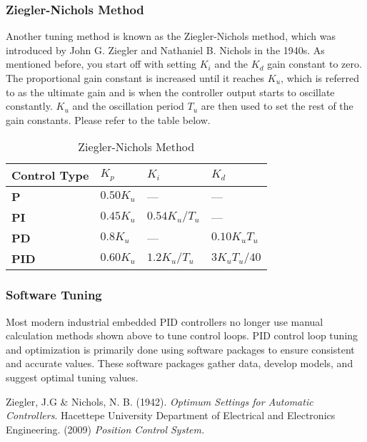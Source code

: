 \documentclass[10pt,conference]{IEEEtran}
\begin{document}
\subsubsection{Ziegler-Nichols Method}

Another tuning method is known as the Ziegler-Nichols method, which was introduced by John
G. Ziegler and Nathaniel B. Nichols in the 1940s. As mentioned before, you start off with
setting \(K_i\) and the \(K_d\) gain constant to zero. The proportional gain constant is
increased until it reaches \(K_u\), which is referred to as the ultimate gain and is when
the controller output starts to oscillate constantly. \(K_u\) and the oscillation period
\(T_u\) are then used to set the rest of the gain constants. Please refer to the table below.

\begin{table}[h]
    \caption{Ziegler-Nichols Method\cite{b1}}
    \begin{center}
        \begin{tabular}{@{}llll@{}}
            \toprule
            \textbf{Control Type} & \(K_p\)     & \(K_i\)         & \(K_d\)        \\ \midrule
            \textbf{P}            & \(0.50K_u\) & ---             & ---            \\
            \textbf{PI}           & \(0.45K_u\) & \(0.54K_u/T_u\) & ---            \\
            \textbf{PD}           & \(0.8K_u\)  & ---             & \(0.10K_uT_u\) \\
            \textbf{PID}          & \(0.60K_u\) & \(1.2K_u/T_u\)  & \(3K_uT_u/40\) \\ \bottomrule
        \end{tabular}
    \end{center}
\end{table}

\subsubsection{Software Tuning}

Most modern industrial embedded PID controllers no longer use manual calculation methods
shown above to tune control loops. PID control loop tuning and optimization is primarily
done using software packages to ensure consistent and accurate values. These software
packages gather data, develop models, and suggest optimal tuning values.

\begin{thebibliography}{00}
     Ziegler, J.G \& Nichols, N. B. (1942). \textit{Optimum Settings for Automatic Controllers}.
     Hacettepe University Department of Electrical and Electronics Engineering. (2009) \textit{Position Control System.}
\end{thebibliography}
\end{document}
